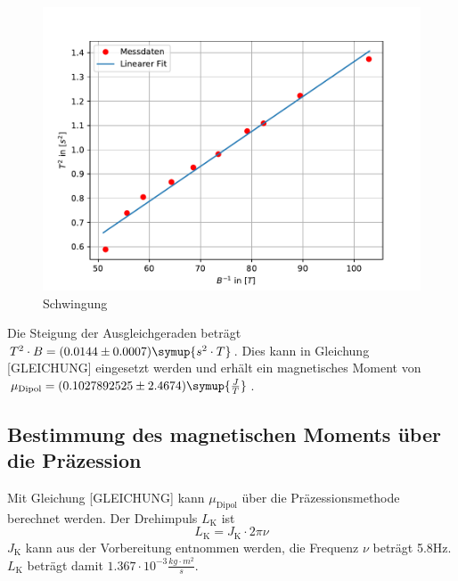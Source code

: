 \begin{figure}[htbp]
\centering
\includegraphics[scale=.9]{SchwingungsMethode.pdf}
\caption{Schwingung}
\label{fig:bildschwingung}
\end{figure}
Die Steigung der Ausgleichgeraden beträgt $T^2\cdot B = (0.0144 \pm 0.0007) \symup{s^2\cdot T}$. 
Dies kann in Gleichung  [GLEICHUNG] eingesetzt werden und erhält ein magnetisches Moment von 
$\mu_{\text{Dipol}}= (0.1027892525 \pm 2.4674 ) \symup{\frac{J}{T}}$.


\subsection{Bestimmung des magnetischen Moments über die Präzession}
Mit Gleichung [GLEICHUNG] kann $\mu_{\text{Dipol}}$ über die Präzessionsmethode berechnet werden. Der Drehimpuls $L_{\text{K}}$ ist
\begin{equation}
L_{\text{K}} = J_{\text{K}} \cdot 2\pi \nu
\end{equation}
$J_{\text{K}}$ kann aus der Vorbereitung entnommen werden, die Frequenz $\nu$ beträgt 5.8Hz. $L_{\text{K}}$ beträgt damit 
$1.367\cdot 10^{-3} \frac{kg\cdot m^2}{s}$.

